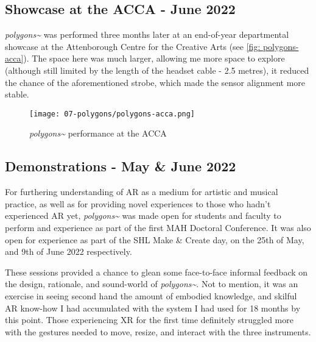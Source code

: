 \subsection{Showcase at the ACCA - June 2022}\label{sec: polygons-performances-acca}
\textit{polygons\textasciitilde{}} was performed three months later at an end-of-year departmental showcase at the Attenborough Centre for the Creative Arts (see \autoref{fig: polygons-acca}). The space here was much larger, allowing me more space to explore (although still limited by the length of the headset cable - 2.5 metres), it reduced the chance of the aforementioned strobe, which made the sensor alignment more stable.

\begin{figure}
    \centering
    \texttt{[image: 07-polygons/polygons-acca.png]}
    \caption{\textit{polygons\textasciitilde{}} performance at the ACCA}
    \label{fig: polygons-acca}
\end{figure}

\subsection{Demonstrations - May \& June 2022}\label{sec: polygons-performances-demos}
For furthering understanding of AR as a medium for artistic and musical practice, as well as for providing novel experiences to those who hadn't experienced AR yet, \textit{polygons\textasciitilde{}} was made open for students and faculty to perform and experience as part of the first MAH Doctoral Conference. It was also open for experience as part of the SHL Make \& Create day, on the 25th of May, and 9th of June 2022 respectively.

These sessions provided a chance to glean some face-to-face informal feedback on the design, rationale, and sound-world of \textit{polygons\textasciitilde{}}. Not to mention, it was an exercise in seeing second hand the amount of embodied knowledge, and skilful AR know-how I had accumulated with the system I had used for 18 months by this point. Those experiencing XR for the first time definitely struggled more with the gestures needed to move, resize, and interact with the three instruments.




